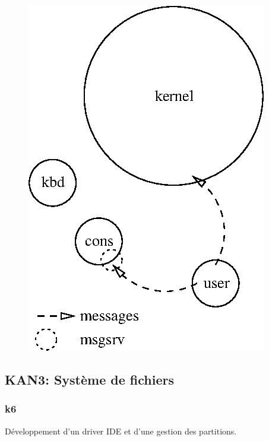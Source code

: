 \documentclass[10pt,a4wide]{article}
\begin{document}
\begin{figure}[h]
\centerline{\includegraphics{figures/k5.eps}}
\end{figure}

\newpage

\subsection{KAN3: Syst\`eme de fichiers}

\subsubsection{k6}

D\'eveloppement d'un driver IDE et d'une gestion des partitions.

\vspace{5cm}
\end{document}

